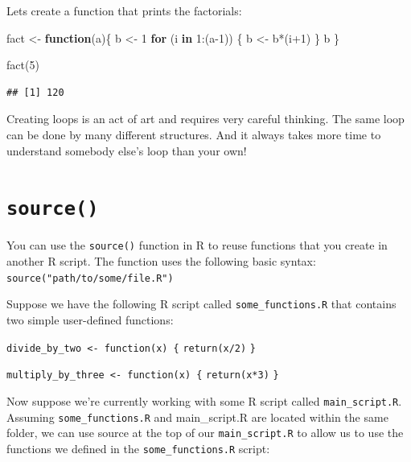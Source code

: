 \documentclass[
]{book}
\newenvironment{Shaded}{\begin{snugshade}}{\end{snugshade}}
\newcommand{\ControlFlowTok}[1]{\textcolor[rgb]{0.13,0.29,0.53}{\textbf{#1}}}
\newcommand{\DecValTok}[1]{\textcolor[rgb]{0.00,0.00,0.81}{#1}}
\newcommand{\FunctionTok}[1]{\textcolor[rgb]{0.00,0.00,0.00}{#1}}
\newcommand{\NormalTok}[1]{#1}
\newcommand{\OtherTok}[1]{\textcolor[rgb]{0.56,0.35,0.01}{#1}}
\newcommand{\SpecialCharTok}[1]{\textcolor[rgb]{0.00,0.00,0.00}{#1}}
\begin{document}
Lets create a function that prints the factorials:

\begin{Shaded}
\begin{Highlighting}[]
\NormalTok{fact }\OtherTok{\textless{}{-}} \ControlFlowTok{function}\NormalTok{(a)\{}
\NormalTok{  b }\OtherTok{\textless{}{-}} \DecValTok{1}
  \ControlFlowTok{for}\NormalTok{ (i }\ControlFlowTok{in} \DecValTok{1}\SpecialCharTok{:}\NormalTok{(a}\DecValTok{{-}1}\NormalTok{)) \{}
\NormalTok{    b }\OtherTok{\textless{}{-}}\NormalTok{ b}\SpecialCharTok{*}\NormalTok{(i}\SpecialCharTok{+}\DecValTok{1}\NormalTok{) }
\NormalTok{  \}}
\NormalTok{  b}
\NormalTok{\}}

\FunctionTok{fact}\NormalTok{(}\DecValTok{5}\NormalTok{)}
\end{Highlighting}
\end{Shaded}

\begin{verbatim}
## [1] 120
\end{verbatim}

Creating loops is an act of art and requires very careful thinking. The same loop can be done by many different structures. And it always takes more time to understand somebody else's loop than your own!

\hypertarget{source}{%
\section{\texorpdfstring{\texttt{source()}}{source()}}\label{source}}

You can use the \texttt{source()} function in R to reuse functions that you create in another R script. The function uses the following basic syntax: \texttt{source("path/to/some/file.R")}

Suppose we have the following R script called \texttt{some\_functions.R} that contains two simple user-defined functions:

\texttt{divide\_by\_two\ \textless{}-\ function(x)\ \{}
\texttt{return(x/2)}
\texttt{\}}

\texttt{multiply\_by\_three\ \textless{}-\ function(x)\ \{}
\texttt{return(x*3)}
\texttt{\}}

Now suppose we're currently working with some R script called \texttt{main\_script.R}. Assuming \texttt{some\_functions.R} and main\_script.R are located within the same folder, we can use source at the top of our \texttt{main\_script.R} to allow us to use the functions we defined in the \texttt{some\_functions.R} script:
\end{document}
